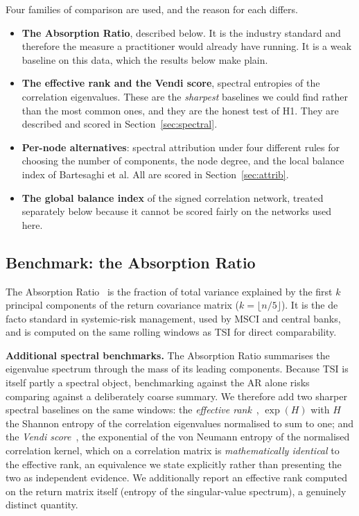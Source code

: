 \documentclass[11pt,a4paper]{article}
\begin{document}
Four families of comparison are used, and the reason for each differs.

\begin{itemize}
\item \textbf{The Absorption Ratio}, described below. It is the industry
  standard and therefore the measure a practitioner would already have running.
  It is a weak baseline on this data, which the results below make plain.
\item \textbf{The effective rank and the Vendi score}, spectral entropies of
  the correlation eigenvalues. These are the \emph{sharpest} baselines we could
  find rather than the most common ones, and they are the honest test of H1.
  They are described and scored in Section~\ref{sec:spectral}.
\item \textbf{Per-node alternatives}: spectral attribution under four different
  rules for choosing the number of components, the node degree, and the local
  balance index of Bartesaghi et al. All are scored in
  Section~\ref{sec:attrib}.
\item \textbf{The global balance index} of the signed correlation network,
  treated separately below because it cannot be scored fairly on the networks
  used here.
\end{itemize}

\subsection{Benchmark: the Absorption Ratio}
\label{sec:ar}

The Absorption Ratio~\cite{kritzman2010} is the fraction of total variance
explained by the first $k$ principal components of the return covariance
matrix ($k = \lfloor n/5 \rfloor$). It is the de facto standard in
systemic-risk management, used by MSCI and central banks, and is computed
on the same rolling windows as TSI for direct comparability.

\textbf{Additional spectral benchmarks.} The Absorption Ratio summarises the
eigenvalue spectrum through the mass of its leading components. Because
TSI is itself partly a spectral object, benchmarking against the AR alone
risks comparing against a deliberately coarse summary. We therefore add two
sharper spectral baselines on the same windows: the \emph{effective
rank}~\cite{roy2007}, $\exp(H)$ with $H$ the Shannon entropy of the
correlation eigenvalues normalised to sum to one; and the \emph{Vendi
score}~\cite{friedman2023}, the exponential of the
von Neumann entropy of the normalised correlation kernel, which on a
correlation matrix is \emph{mathematically identical} to the effective rank,
an equivalence we state explicitly rather than presenting the two as
independent evidence. We additionally report an effective rank computed on the
return matrix itself (entropy of the singular-value spectrum), a genuinely
distinct quantity.
\end{document}

